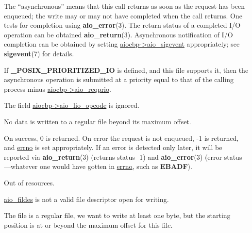 \documentclass[]{article}
\let\realtextbf=\textbf
\renewcommand{\textbf}[1]{\textcolor{boldcolor}{\realtextbf{#1}}}
\renewcommand{\emph}[1]{\underline{#1}}
\begin{document}
The ``asynchronous'' means that this call returns as soon as the request
has been enqueued; the write may or may not have completed when the call
returns. One tests for completion using \textbf{aio\_error}(3). The
return status of a completed I/O operation can be obtained
\textbf{aio\_return}(3). Asynchronous notification of I/O completion can
be obtained by setting \emph{aiocbp-\textgreater{}aio\_sigevent}
appropriately; see \textbf{sigevent}(7) for details.

If \textbf{\_POSIX\_PRIORITIZED\_IO} is defined, and this file supports
it, then the asynchronous operation is submitted at a priority equal to
that of the calling process minus
\emph{aiocbp-\textgreater{}aio\_reqprio}.

The field \emph{aiocbp-\textgreater{}aio\_lio\_opcode} is ignored.

No data is written to a regular file beyond its maximum offset.


On success, 0 is returned. On error the request is not enqueued, -1 is
returned, and \emph{errno} is set appropriately. If an error is detected
only later, it will be reported via \textbf{aio\_return}(3) (returns
status -1) and \textbf{aio\_error}(3) (error status---whatever one would
have gotten in \emph{errno}, such as \textbf{EBADF}).


\begin{description}
\itemsep1pt\parskip0pt
\item[\textbf{EAGAIN}]
Out of resources.
\end{description}

\begin{description}
\itemsep1pt\parskip0pt
\item[\textbf{EBADF}]
\emph{aio\_fildes} is not a valid file descriptor open for writing.
\end{description}

\begin{description}
\itemsep1pt\parskip0pt
\item[\textbf{EFBIG}]
The file is a regular file, we want to write at least one byte, but the
starting position is at or beyond the maximum offset for this file.
\end{description}
\end{document}
